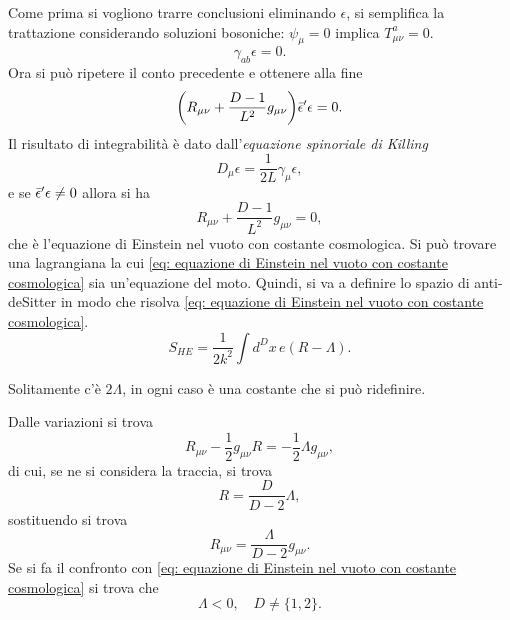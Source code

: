 Come prima si vogliono trarre conclusioni eliminando $\epsilon$, si semplifica la trattazione considerando soluzioni bosoniche: $\psi_\mu = 0$ implica $T_{\mu\nu}^a = 0$.
\begin{equation}
    [R^{ab}_{\mu\nu} + \frac{1}{L^2}(e^a_\mu e^b_\nu - e^b_\mu e^a_\nu)]\gamma_{ab}\epsilon = 0.
\end{equation}
Ora si può ripetere il conto precedente e ottenere alla fine 
\begin{equation}
    \bigg(R_{\mu\nu} + \frac{D - 1}{L^2}g_{\mu\nu}\bigg)\bar{\epsilon}'\epsilon = 0.
\end{equation}
Il risultato di integrabilità è dato dall'\emph{equazione spinoriale di Killing}
\begin{equation}
    D_\mu \epsilon = \frac{1}{2L}\gamma_\mu\epsilon,
\end{equation}
e se $\bar{\epsilon}'\epsilon \neq 0$ allora si ha 
\begin{equation}
\label{eq: equazione di Einstein nel vuoto con costante cosmologica}
    R_{\mu\nu} + \frac{D - 1}{L^2}g_{\mu\nu} = 0,
\end{equation}
che è l'equazione di Einstein nel vuoto con costante cosmologica. Si può trovare una lagrangiana la cui \eqref{eq: equazione di Einstein nel vuoto con costante cosmologica} sia un'equazione del moto. Quindi, si va a definire lo spazio di anti-deSitter in modo che risolva \eqref{eq: equazione di Einstein nel vuoto con costante cosmologica}.
\begin{equation}
    S_{HE} = \frac{1}{2k^2}\int d^Dx\,e(R - \Lambda).
\end{equation}
\begin{obs}
    Solitamente c'è $2\Lambda$, in ogni caso è una costante che si può ridefinire. 
\end{obs}
Dalle variazioni si trova 
\begin{equation}
    R_{\mu\nu} - \frac{1}{2}g_{\mu\nu}R = -\frac{1}{2}\Lambda g_{\mu\nu},
\end{equation}
di cui, se ne si considera la traccia, si trova 
\begin{equation}
    R = \frac{D}{D - 2}\Lambda,
\end{equation}
sostituendo si trova 
\begin{equation}
    R_{\mu\nu} = \frac{\Lambda}{D - 2}g_{\mu\nu}.
\end{equation}
Se si fa il confronto con \eqref{eq: equazione di Einstein nel vuoto con costante cosmologica} si trova che 
\begin{equation}
    \Lambda < 0,\quad D \neq \{1,2\}.
\end{equation}
